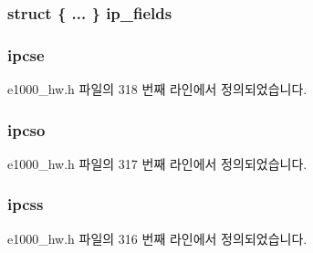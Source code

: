 \subsubsection[{\texorpdfstring{ip\+\_\+fields}{ip_fields}}]{\setlength{\rightskip}{0pt plus 5cm}struct \{ ... \}   ip\+\_\+fields}\hypertarget{structe1000__context__desc_a53b2fbda6f13da365a46827e6cbaa15d}{}\label{structe1000__context__desc_a53b2fbda6f13da365a46827e6cbaa15d}
\subsubsection[{\texorpdfstring{ipcse}{ipcse}}]{ ipcse}\hypertarget{structe1000__context__desc_a0c19ae7611add97ea4f3fcfe1dd9bc86}{}\label{structe1000__context__desc_a0c19ae7611add97ea4f3fcfe1dd9bc86}


e1000\+\_\+hw.\+h 파일의 318 번째 라인에서 정의되었습니다.

\subsubsection[{\texorpdfstring{ipcso}{ipcso}}]{ ipcso}\hypertarget{structe1000__context__desc_ae95d4ff912499be8ccaba27bbe430746}{}\label{structe1000__context__desc_ae95d4ff912499be8ccaba27bbe430746}


e1000\+\_\+hw.\+h 파일의 317 번째 라인에서 정의되었습니다.

\subsubsection[{\texorpdfstring{ipcss}{ipcss}}]{ ipcss}\hypertarget{structe1000__context__desc_adda8b6fde08a07f62a1971811bf6616b}{}\label{structe1000__context__desc_adda8b6fde08a07f62a1971811bf6616b}


e1000\+\_\+hw.\+h 파일의 316 번째 라인에서 정의되었습니다.

